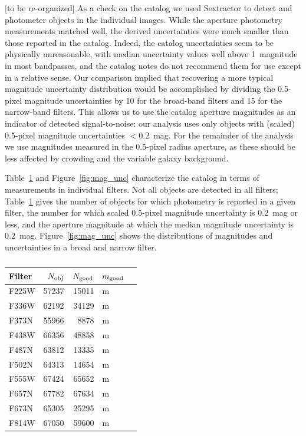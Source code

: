 [to be re-organized] As a check on the catalog we used Sextractor to detect and photometer objects in the individual images.
While the aperture photometry measurements matched well, the derived uncertainties were much smaller than those reported in the catalog.
Indeed, the catalog uncertainties seem to be physically unreasonable, with median uncertainty values well above 1~magnitude in
most bandpasses, and the catalog notes do not recommend them for use except in a relative sense.
Our comparison implied that recovering a more typical magnitude uncertainty distribution would be accomplished by
dividing the 0.5-pixel magnitude uncertainties  by 10 for the broad-band filters and 15 for the narrow-band filters.
This allows us to use the catalog aperture magnitudes as an indicator of detected signal-to-noise: our analysis uses only objects with
(scaled) 0.5-pixel magnitude uncertainties $<0.2$~mag.
For the remainder of the analysis we use magnitudes measured in the 0.5-pixel radius aperture, as these should be less affected
by crowding and the variable galaxy background.

Table~\ref{tab:cat_numbers} and Figure~\ref{fig:mag_unc} characterize the catalog in terms of measurements in individual filters.
Not all objects are detected in all filters;
Table~\ref{tab:cat_numbers} gives the number of objects for which photometry is reported in a given filter,
the number for which scaled 0.5-pixel magnitude uncertainty is $0.2$~mag or less,
and the aperture magnitude at which the median magnitude uncertainty is $0.2$~mag. %
Figure~\ref{fig:mag_unc} shows the distributions of magnitudes and uncertainties in a broad and narrow filter. %

\begin{table}
\centering
\caption{
\label{tab:cat_numbers}}
\begin{tabular}{lrrlr}
\hline\hline
Filter & $N_{\rm obj}$ & $N_{\rm good}$ & $m_{\rm good}$ \\
\hline
F225W &  57237 & 15011 & m \\
F336W &  62192 & 34129 & m \\
F373N &  55966 & 8878 & m \\
F438W &  66356 & 48858 & m \\
F487N &  63812 & 13335 & m \\
F502N &  64313 & 14654 & m \\
F555W &  67424 & 65652 & m \\
F657N &  67782 & 67634 & m \\
F673N &  65305 & 25295 & m \\
F814W &  67050 & 59600 & m \\
\hline
\end{tabular}
\end{table}

